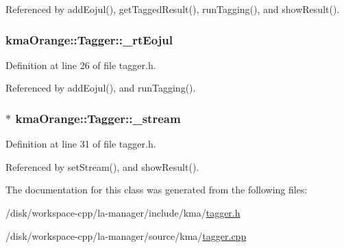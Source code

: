 Referenced by addEojul(), getTaggedResult(), runTagging(), and showResult().\hypertarget{classkmaOrange_1_1Tagger_7ecadcf482481e16714b42216cb0eaad}{
\subsubsection[{\_\-rtEojul}]{ {\bf kmaOrange::Tagger::\_\-rtEojul}}}
\label{classkmaOrange_1_1Tagger_7ecadcf482481e16714b42216cb0eaad}




Definition at line 26 of file tagger.h.

Referenced by addEojul(), and runTagging().\hypertarget{classkmaOrange_1_1Tagger_0f94379d43beb1ea9e742e313a19d26d}{
\subsubsection[{\_\-stream}]{$\ast$ {\bf kmaOrange::Tagger::\_\-stream}}}
\label{classkmaOrange_1_1Tagger_0f94379d43beb1ea9e742e313a19d26d}




Definition at line 31 of file tagger.h.

Referenced by setStream(), and showResult().

The documentation for this class was generated from the following files:\begin{CompactItemize}
\item 
/disk/workspace-cpp/la-manager/include/kma/\hyperlink{tagger_8h}{tagger.h}\item 
/disk/workspace-cpp/la-manager/source/kma/\hyperlink{tagger_8cpp}{tagger.cpp}\end{CompactItemize}
